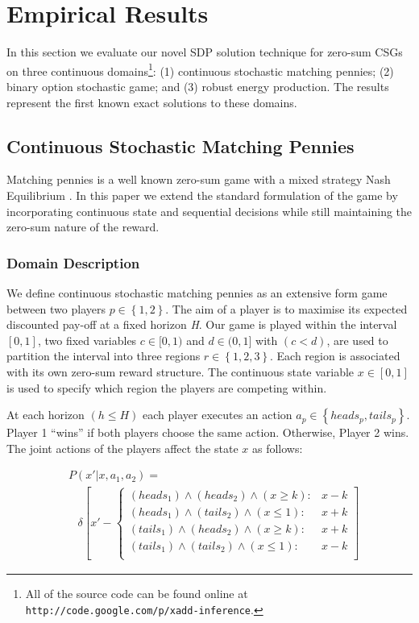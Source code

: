 \section{Empirical Results}
\label{sec:results}

In this section we evaluate our novel SDP solution technique for zero-sum CSGs 
on three continuous domains\footnote{\fontsize{8pt}{10pt}\selectfont All of the source code can be found online at 
\texttt{http://code.google.com/p/xadd-inference}.}: 
(1) continuous stochastic matching pennies; (2) 
binary option stochastic game; and (3) robust energy production. The results represent
the first known exact solutions to these domains. 

\subsection{Continuous Stochastic Matching Pennies}

Matching pennies is a well known zero-sum game with a 
mixed strategy Nash Equilibrium \cite{Osborne_2004}. In this paper we extend 
the standard formulation of the game by incorporating continuous state 
and sequential decisions while still maintaining the zero-sum nature of 
the reward.

\subsubsection{Domain Description}

We define continuous stochastic matching pennies as an extensive
form game between two players $p \in \left\{1, 2 \right\}$. The aim of a 
player is to maximise its expected discounted pay-off at a fixed horizon \emph{H}. 
Our game is played within the interval $[0, 1]$, two fixed variables 
$c \in [0, 1)$ and $d \in (0, 1]$ with $(c < d)$,  are used to partition the interval into
three regions $r \in \left\{1, 2, 3 \right\}$. Each region is associated 
with its own zero-sum reward structure. The continuous state variable 
$x \in [0, 1]$ is used to specify which region the players are competing within.

At each horizon $(h \leq H)$ each player executes an action $a_p \in \left\{ heads_p, tails_p \right\}$. 
Player 1 ``wins'' if both players choose the same action. Otherwise, Player 2 wins. 
The joint actions of the players affect the state $x$ as follows:

{\small 
\abovedisplayskip=0pt
\belowdisplayskip=0pt
\begin{align*}
&P(x' | x, a_{1}, a_{2}) = \\
& \hspace{10pt} \delta \left[ x' - \begin{cases}
      (heads_{1}) \wedge (heads_{2}) \wedge (x \geq k) : & x - k \\
      (heads_{1}) \wedge (tails_{2}) \wedge (x \leq 1) : & x + k \\
      (tails_{1}) \wedge (heads_{2}) \wedge (x \geq k): & x + k \\
      (tails_{1}) \wedge (tails_{2}) \wedge (x \leq 1) : & x - k  \\
    \end{cases} \right]
\end{align*}
}%

